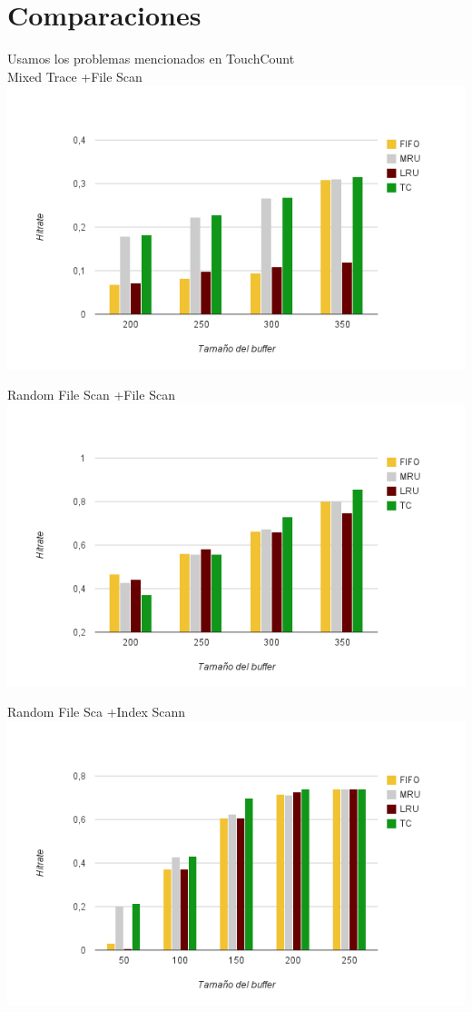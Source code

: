 \section{Comparaciones}
Usamos los problemas mencionados en TouchCount\\

Mixed Trace +File Scan\\
\includegraphics[scale=.80]{grafico1-1}

Random File Scan +File Scan\\
\includegraphics[scale=.80]{grafico1-2}

Random File Sca +Index Scann\\
\includegraphics[scale=.80]{grafico2-1}

